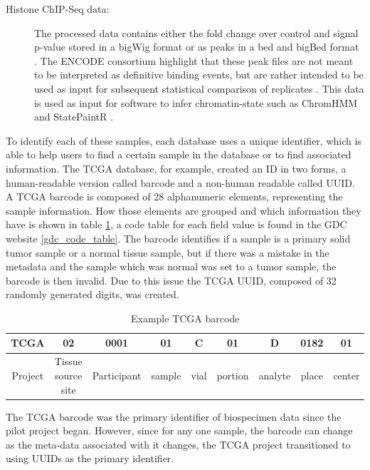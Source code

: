 \begin{description}
  \item [Histone ChIP-Seq data:] The processed data contains either the fold change over control and signal p-value stored
  in a bigWig format or as peaks in a bed and bigBed format \cite{ENCODE_chipseq}.  The ENCODE consortium highlight that these peak files are not meant to be interpreted as definitive binding events, but are rather intended to be used as input for subsequent statistical comparison of replicates \cite{ENCODE_chipseq}. This data is used as input for software
   to infer chromatin-state such as ChromHMM \cite{ernst2012chromhmm} and StatePaintR \cite{statepaintr}.
\end{description}

To identify each of these samples, each database uses a unique identifier, which is able
to help users to find a certain sample in the database or to find associated information.
The TCGA database, for example, created an ID in two forms, a human-readable version called barcode and
a non-human readable called UUID. A TCGA barcode is composed of 28 alphanumeric elements, representing
the sample information. How those elements are grouped and which information they have is shown in table \ref{tab:barcode}, a code table for each field value is found in the GDC website \ref{gdc_code_table}.
The barcode identifies if a sample is a primary solid tumor sample or a normal tissue sample,
but if there was a mistake in the metadata and the sample which was normal was set to a tumor sample,
the barcode is then invalid. Due to this issue the TCGA UUID, composed of 32 randomly generated digits, was created.

\begin{table}[]
\centering
\caption{Example TCGA barcode}
\label{tab:barcode}
\begin{tabular}{|c|c|c|c|c|c|c|c|c|}
\hline
TCGA    & 02                 & 0001        & 01     & C    & 01      & D       & 0182  & 01     \\ \hline
Project & Tissue source site & Participant & sample & vial & portion & analyte & place & center \\ \hline
\end{tabular}
\end{table}

The TCGA barcode was the primary identifier of biospecimen data since the pilot project began. However, since for any one sample, the barcode can change as the meta-data associated with it changes, the TCGA project transitioned to using UUIDs as the primary identifier.


